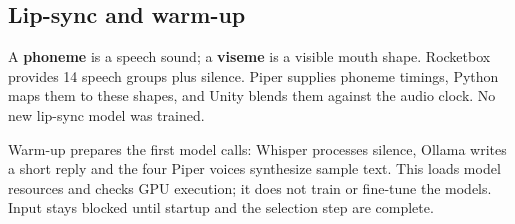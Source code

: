 \subsection{Lip-sync and warm-up}
A \textbf{phoneme} is a speech sound; a \textbf{viseme} is a visible mouth shape.
Rocketbox provides 14 speech groups plus silence. Piper supplies phoneme timings,
Python maps them to these shapes, and Unity blends them against the audio clock.
No new lip-sync model was trained.

Warm-up prepares the first model calls: Whisper processes silence, Ollama writes
a short reply and the four Piper voices synthesize sample text. This loads model
resources and checks GPU execution; it does not train or fine-tune the models.
Input stays blocked until startup and the selection step are complete.

